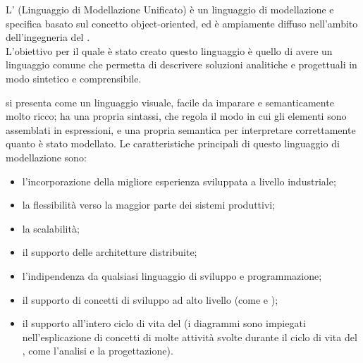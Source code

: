  \label{app:UML}
L' (Linguaggio di Modellazione Unificato) è un linguaggio di modellazione e specifica basato sul concetto object-oriented, ed è ampiamente diffuso nell'ambito dell'ingegneria del .\\
L'obiettivo per il quale è stato creato questo linguaggio è quello di avere un linguaggio comune che permetta di descrivere soluzioni analitiche e progettuali in modo sintetico e comprensibile.

 si presenta come un linguaggio visuale, facile da imparare e semanticamente molto ricco; ha una propria sintassi, che regola il modo in cui gli elementi sono assemblati in espressioni, e una propria semantica per interpretare correttamente quanto è stato modellato.
Le caratteristiche principali di questo linguaggio di modellazione sono:
\begin{itemize}
	\item l'incorporazione della migliore esperienza sviluppata a livello industriale;
	\item la flessibilità verso la maggior parte dei sistemi produttivi;
	\item la scalabilità;
	\item il supporto delle architetture distribuite;
	\item l'indipendenza da qualsiasi linguaggio di sviluppo e programmazione;
	\item il supporto di concetti di sviluppo ad alto livello (come  e );
	\item il supporto all'intero ciclo di vita del  (i diagrammi  sono impiegati nell'esplicazione di concetti di molte attività svolte durante il ciclo di vita del , come l'analisi e la progettazione).
\end{itemize}

